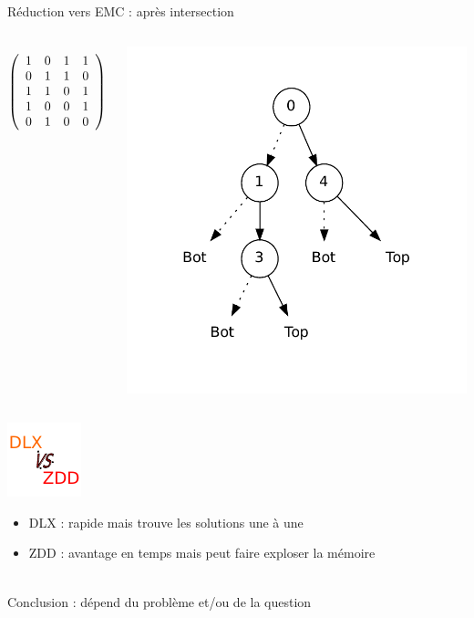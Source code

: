 \documentclass{beamer}
\begin{document}
\begin{frame}{Réduction vers EMC : après intersection}
  \begin{columns}

  \begin{displaymath}
   \left(\begin{array}{ c c c c c }
   1 & 0 & 1 & 1 \\
   0 & 1 & 1 & 0 \\
   1 & 1 & 0 & 1 \\
   1 & 0 & 0 & 1 \\
   0 & 1 & 0 & 0
  \end{array}\right)
  \end{displaymath}

    \includegraphics[height=0.8\textheight]{../imports/inter.pdf}
  \end{columns}
\end{frame}

\begin{frame}{}
\begin{center}
    \includegraphics[height=0.5\textheight]{../imports/vs.pdf}
\end{center}
\begin{itemize}
\item DLX : rapide mais trouve les solutions une à une
\item ZDD : avantage en temps mais peut faire exploser la mémoire \\
\end{itemize}
~\\
Conclusion : dépend du problème et/ou de la question
\end{frame}
\end{document}
